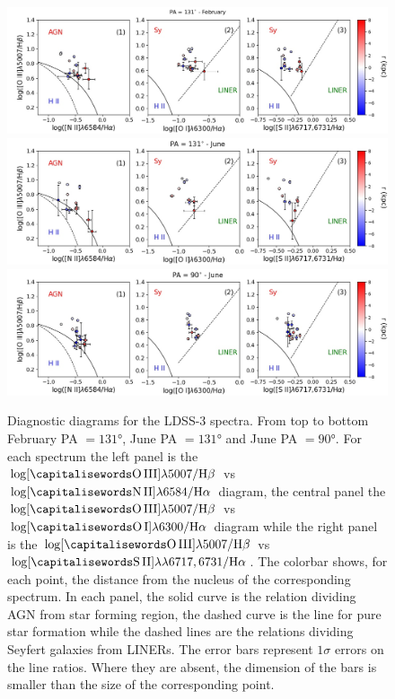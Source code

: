 \documentclass[../thesis.tex]{subfiles}
\begin{document}
\begin{figure}
\centering
\includegraphics[width=\textwidth]{images/paper3/PA131_2016_diagnostic.jpg}\\ 
\includegraphics[width=\textwidth]{images/paper3/PA131_diagnostic.jpg}\\ 
\includegraphics[width=\textwidth]{images/paper3/PA90_diagnostic.jpg}\\ 
\caption[]{Diagnostic diagrams for the LDSS-3 spectra. From top to bottom February PA $=\ang{131}$, June PA $=\ang{131}$ and June PA $=\ang{90}$. For each spectrum the left panel is the  $\log [\rm \ion{O}{III}]\lambda5007/\Hb$ vs $\log [\rm \ion{N}{II}]\lambda6584/\Ha$ diagram, the central panel the $\log [\rm \ion{O}{III}]\lambda5007/\Hb$ vs $\log [\rm \ion{O}{I}]\lambda6300/\Ha$ diagram while the right panel is the $\log [\rm \ion{O}{III}]\lambda5007/\Hb$ vs $\log [\rm \ion{S}{II}]\lambda\lambda6717,6731/\Ha$. The colorbar shows, for each point, the distance from the nucleus of the corresponding spectrum.
In each panel, the solid curve is the \citet{Kewley01} relation dividing AGN from star forming region, the dashed curve is the \citet{Kauffmann03} line for pure star formation while the dashed lines are the \citet{Kewley06} relations dividing Seyfert galaxies from LINERs.
The error bars represent $1\sigma$ errors on the line ratios. Where they are absent, the dimension of the bars is smaller than the size of the corresponding point. 
}
\label{fig:pap3_diagnostic}
\end{figure} 
\end{document}
